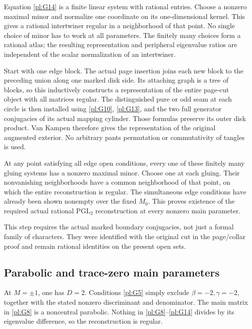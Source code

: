 Equation \eqref{pl:G14} is a finite linear system with rational entries.
Choose a nonzero maximal minor and normalize one coordinate
on its one-dimensional kernel. This gives a rational
intertwiner regular in a neighborhood of that point.
No single choice of minor has to work at all parameters.
The finitely many choices form a rational atlas; the resulting
representation and peripheral eigenvalue ratios are independent
of the scalar normalization of an intertwiner.

Start with one edge block. The actual page insertion joins each
new block to the preceding union along one marked disk side.
Its attaching graph is a tree of blocks, so this inductively
constructs a representation of the entire page-cut object with
all matrices regular. The distinguished pure or odd seam at
each circle is then installed using \eqref{pl:G10}, \eqref{pl:G13}, and the two
full generator conjugacies of its actual mapping cylinder.
Those formulas preserve its outer disk product. Van Kampen
therefore gives the representation of the original augmented
exterior. No arbitrary pants permutation or commutativity of
tangles is used.

At any point satisfying all edge open conditions, every one of
these finitely many gluing systems has a nonzero maximal minor.
Choose one at each gluing. Their nonvanishing neighborhoods have
a common neighborhood of that point, on which the entire
reconstruction is regular. The simultaneous edge conditions have
already been shown nonempty over the fixed \(M_0\). This proves existence of
the required actual rational \(\mathrm{PGL}_2\) reconstruction
at every nonzero main parameter.

This step requires the actual marked boundary conjugacies,
not just a formal family of characters. They were identified
with the original cut in the page/collar proof and remain
rational identities on the present open sets.

\subsection{Parabolic and trace-zero main parameters}\label{pl:the-exceptional-looking-main-parameters}

At \(M=\pm1\), one has \(D=2\). Conditions \eqref{pl:G5} simply
exclude \(\beta=-2,\gamma=-2\), together with the stated
nonzero discriminant and denominator. The main matrix in
\eqref{pl:G8} is a noncentral parabolic. Nothing in \eqref{pl:G8}--\eqref{pl:G14} divides
by its eigenvalue difference, so the reconstruction is regular.

